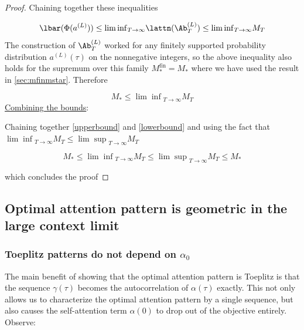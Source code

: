 \documentclass{article}
\begin{document}
\begin{proof}
Chaining together these inequalities 

\begin{equation}
    \lbar(\Phi(a^{(L)})) \le {\lim\inf}_{T\to\infty}\lattn(\Ab_T^{(L)})\le {\lim\inf}_{T\to\infty}M_T
\end{equation}
The construction of $\Ab_T^{(L)}$ worked for any finitely supported probability distribution $a^{(L)}(\tau)$ on the nonnegative integers, so the above inequality also holds for the supremum over this family $M_\ast^{\textrm{fin}} = M_\ast$ where we have used the result in \ref{sec:mfinmstar}. Therefore 

\begin{equation}\label{lowerbound}
    M_\ast \le {\lim\inf}_{T\to\infty}M_T
\end{equation}
\newline
\newline
\underline{Combining the bounds}:

Chaining together \eqref{upperbound} and \eqref{lowerbound} and using the fact that ${\lim\inf}_{T\to\infty}M_T \le {\lim\sup}_{T\to\infty}M_T$

\begin{equation}
    M_\ast \le {\lim\inf}_{T\to\infty}M_T \le {\lim\sup}_{T\to\infty}M_T \le M_\ast
\end{equation}

which concludes the proof
\end{proof}

\subsection{Optimal attention pattern is geometric in the large context limit}

\subsubsection{Toeplitz patterns do not depend on $\alpha_0$}
The main benefit of showing that the optimal attention pattern is Toeplitz is that the sequence $\gamma(\tau)$ becomes the autocorrelation of $\alpha(\tau)$ exactly. This not only allows us to characterize the optimal attention pattern by a single sequence, but also causes the self-attention term $\alpha(0)$ to drop out of the objective entirely. Observe: 
\end{document}
